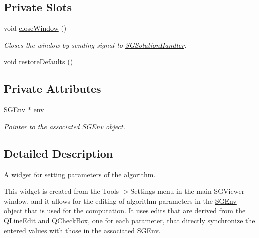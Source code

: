 \subsection*{Private Slots}
\begin{DoxyCompactItemize}
\item 
\mbox{\label{classSGSettingsHandler_ac029c286082f366d9502edbf4bbb6db4}} 
void \hyperlink{classSGSettingsHandler_ac029c286082f366d9502edbf4bbb6db4}{close\+Window} ()
\begin{DoxyCompactList}\small\item\em Closes the window by sending signal to \hyperlink{classSGSolutionHandler}{S\+G\+Solution\+Handler}. \end{DoxyCompactList}\item 
void \hyperlink{classSGSettingsHandler_a3d119fdf3a3f1c29e8293940613c8b3f}{restore\+Defaults} ()
\end{DoxyCompactItemize}
\subsection*{Private Attributes}
\begin{DoxyCompactItemize}
\item 
\mbox{\label{classSGSettingsHandler_ab01218eaff9a9219155aff6b0c237f46}} 
\hyperlink{classSGEnv}{S\+G\+Env} $\ast$ \hyperlink{classSGSettingsHandler_ab01218eaff9a9219155aff6b0c237f46}{env}
\begin{DoxyCompactList}\small\item\em Pointer to the associated \hyperlink{classSGEnv}{S\+G\+Env} object. \end{DoxyCompactList}\end{DoxyCompactItemize}


\subsection{Detailed Description}
A widget for setting parameters of the algorithm. 

This widget is created from the Tools-\/$>$Settings menu in the main S\+G\+Viewer window, and it allows for the editing of algorithm parameters in the \hyperlink{classSGEnv}{S\+G\+Env} object that is used for the computation. It uses edits that are derived from the Q\+Line\+Edit and Q\+Check\+Box, one for each parameter, that directly synchronize the entered values with those in the associated \hyperlink{classSGEnv}{S\+G\+Env}. 

